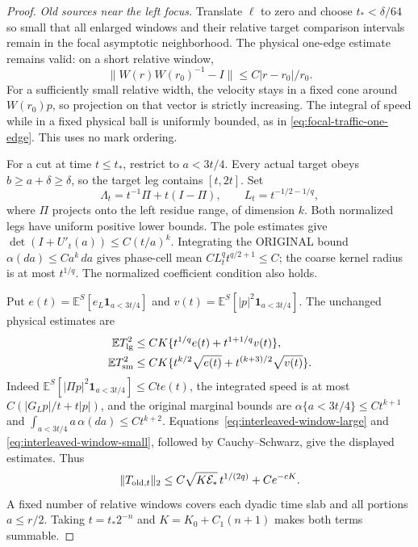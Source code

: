 \documentclass[11pt,reqno]{amsart}
\theoremstyle{definition}
\theoremstyle{remark}
\numberwithin{equation}{section}
\newcommand{\E}{\mathbb E}
\begin{document}
\begin{proof}
\emph{Old sources near the left focus.}
Translate \(\ell\) to zero and choose \(t_*<\delta/64\) so small
that all enlarged windows and their relative target comparison
intervals remain in the focal asymptotic neighborhood. The physical
one-edge estimate remains valid: on a short relative window,
\[
 \|W(r)W(r_0)^{-1}-I\|\le C|r-r_0|/r_0.
\]
For a sufficiently small relative width, the velocity stays in a
fixed cone around \(W(r_0)p\), so projection on that vector is
strictly increasing. The integral of speed while in a fixed physical
ball is uniformly bounded, as in
\eqref{eq:focal-traffic-one-edge}. This uses no mark ordering.

For a cut at time \(t\le t_*\), restrict to \(a<3t/4\). Every
actual target obeys \(b\ge a+\delta\ge\delta\), so the target
leg contains \([t,2t]\). Set
\[
 \Lambda_t=t^{-1}\Pi+t(I-\Pi),\qquad
 L_t=t^{-1/2-1/q},
\]
where \(\Pi\) projects onto the left residue range, of dimension
\(k\). Both normalized legs have uniform positive lower bounds.
The pole estimates give
\(\det(I+U'_t(a))\le C(t/a)^k\). Integrating the ORIGINAL
bound \(\alpha(da)\le Ca^k\,da\) gives phase-cell mean
\(C L_t^q t^{q/2+1}\le C\); the coarse kernel radius is at most
\(t^{1/q}\). The normalized coefficient condition also holds.

Put \(e(t)=\E^S[e_L\mathbf1_{a<3t/4}]\) and
\(v(t)=\E^S[|p|^2\mathbf1_{a<3t/4}]\).
The unchanged physical estimates are
\[
 \begin{split}
 \E T_{\rm lg}^2&\le CK
       \{t^{1/q}e(t)+t^{1+1/q}v(t)\},\\
 \E T_{\rm sm}^2&\le CK
       \{t^{k/2}\sqrt{e(t)}+t^{(k+3)/2}\sqrt{v(t)}\}.
 \end{split}
\]
Indeed \(\E^S[|\Pi p|^2\mathbf1_{a<3t/4}]\le Ct e(t)\),
the integrated speed is at most
\(C(|G_Lp|/t+t|p|)\), and the original marginal bounds are
\(\alpha\{a<3t/4\}\le Ct^{k+1}\) and
\(\int_{a<3t/4}a\,\alpha(da)\le Ct^{k+2}\).
Equations~\eqref{eq:interleaved-window-large} and
\eqref{eq:interleaved-window-small}, followed by Cauchy--Schwarz,
give the displayed estimates. Thus
\begin{equation}
\label{eq:interleaved-old-sum}
 \|T_{{\rm old},t}\|_2
 \le C\sqrt{K\mathcal E_*}\,t^{1/(2q)}+Ce^{-cK}.
\end{equation}
A fixed number of relative windows covers each dyadic time slab and
all portions \(a\le r/2\). Taking \(t=t_*2^{-n}\) and
\(K=K_0+C_1(n+1)\) makes both terms summable.


\end{proof}
\end{document}
